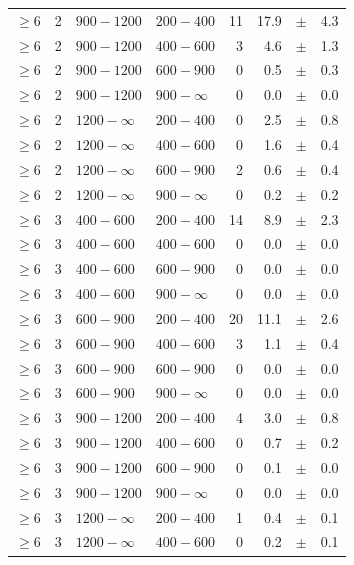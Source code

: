 \begin{table}[!h]
\begin{tabular}{rrllrrcl}
$\geq 6$ & 2 & $ 900-1200$ & $200-400$ &     11 &     17.9 &$\pm$&    4.3 \\
$\geq 6$ & 2 & $ 900-1200$ & $400-600$ &      3 &      4.6 &$\pm$&    1.3 \\
$\geq 6$ & 2 & $ 900-1200$ & $600-900$ &      0 &      0.5 &$\pm$&    0.3 \\
$\geq 6$ & 2 & $ 900-1200$ & $900-\infty$ &      0 &      0.0 &$\pm$&    0.0 \\
$\geq 6$ & 2 & $1200- \infty$ & $200-400$ &      0 &      2.5 &$\pm$&    0.8 \\
$\geq 6$ & 2 & $1200- \infty$ & $400-600$ &      0 &      1.6 &$\pm$&    0.4 \\
$\geq 6$ & 2 & $1200- \infty$ & $600-900$ &      2 &      0.6 &$\pm$&    0.4 \\
$\geq 6$ & 2 & $1200- \infty$ & $900-\infty$ &      0 &      0.2 &$\pm$&    0.2 \\
$\geq 6$ & 3 & $ 400- 600$ & $200-400$ &     14 &      8.9 &$\pm$&    2.3 \\
$\geq 6$ & 3 & $ 400- 600$ & $400-600$ &      0 &      0.0 &$\pm$&    0.0 \\
$\geq 6$ & 3 & $ 400- 600$ & $600-900$ &      0 &      0.0 &$\pm$&    0.0 \\
$\geq 6$ & 3 & $ 400- 600$ & $900-\infty$ &      0 &      0.0 &$\pm$&    0.0 \\
$\geq 6$ & 3 & $ 600- 900$ & $200-400$ &     20 &     11.1 &$\pm$&    2.6 \\
$\geq 6$ & 3 & $ 600- 900$ & $400-600$ &      3 &      1.1 &$\pm$&    0.4 \\
$\geq 6$ & 3 & $ 600- 900$ & $600-900$ &      0 &      0.0 &$\pm$&    0.0 \\
$\geq 6$ & 3 & $ 600- 900$ & $900-\infty$ &      0 &      0.0 &$\pm$&    0.0 \\
$\geq 6$ & 3 & $ 900-1200$ & $200-400$ &      4 &      3.0 &$\pm$&    0.8 \\
$\geq 6$ & 3 & $ 900-1200$ & $400-600$ &      0 &      0.7 &$\pm$&    0.2 \\
$\geq 6$ & 3 & $ 900-1200$ & $600-900$ &      0 &      0.1 &$\pm$&    0.0 \\
$\geq 6$ & 3 & $ 900-1200$ & $900-\infty$ &      0 &      0.0 &$\pm$&    0.0 \\
$\geq 6$ & 3 & $1200- \infty$ & $200-400$ &      1 &      0.4 &$\pm$&    0.1 \\
$\geq 6$ & 3 & $1200- \infty$ & $400-600$ &      0 &      0.2 &$\pm$&    0.1 \\

\end{tabular}
\end{table}
